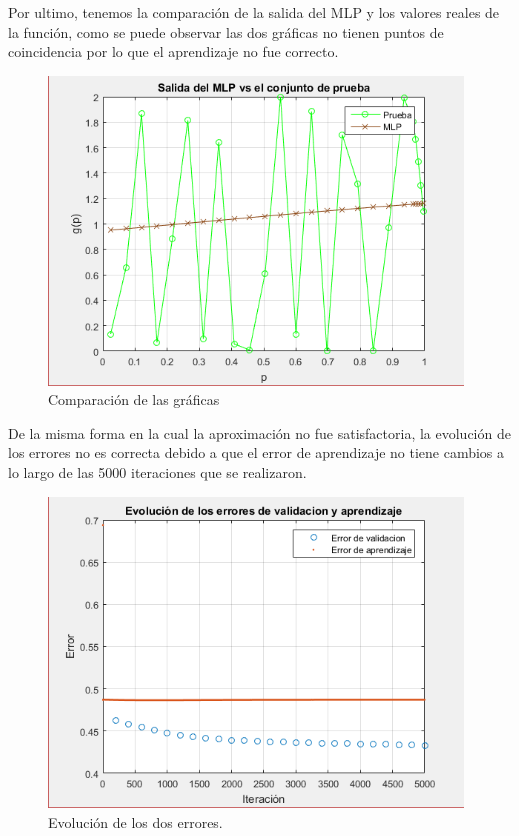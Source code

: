 Por ultimo, tenemos la comparación de la salida del MLP y los valores reales de la función, como se puede observar las dos gráficas no tienen puntos de coincidencia por lo que el aprendizaje no fue correcto.
\begin{figure}[H]
    \begin{center}
        \includegraphics[width=11cm]{4/prueba.png}
        \caption{Comparación de las gráficas}
        \label{fig:prueba4}
    \end{center}
\end{figure}
De la misma forma en la cual la aproximación no fue satisfactoria, la evolución de los errores no es correcta debido a que el error de aprendizaje no tiene cambios a lo largo de las 5000 iteraciones que se realizaron.
\begin{figure}[H]
    \begin{center}
        \includegraphics[width=11cm]{4/error.png}
        \caption{Evolución de los dos errores.}
        \label{fig:error4}
    \end{center}
\end{figure}

